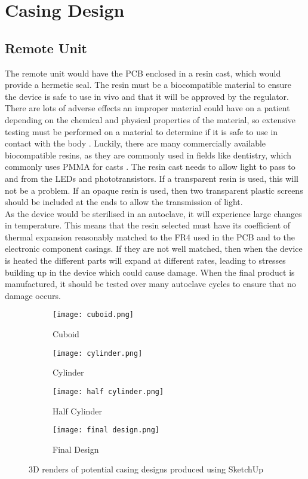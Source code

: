 \section{Casing Design}

\subsection{Remote Unit}
The remote unit would have the PCB enclosed in a resin cast, which would provide a hermetic seal. The resin must be a biocompatible material to ensure the device is safe to use in vivo and that it will be approved by the regulator. There are lots of adverse effects an improper material could have on a patient depending on the chemical and physical properties of the material, so extensive testing must be performed on a material to determine if it is safe to use in contact with the body \cite{biocompatible_tests}. Luckily, there are many commercially available biocompatible resins, as they are commonly used in fields like dentistry, which commonly uses PMMA for casts \cite{biocompatible_resin}. The resin cast needs to allow light to pass to and from the LEDs and phototransistors. If a transparent resin is used, this will not be a problem. If an opaque resin is used, then two transparent plastic screens should be included at the ends to allow the transmission of light.\\

As the device would be sterilised in an autoclave, it will experience large changes in temperature. This means that the resin selected must have its coefficient of thermal expansion reasonably matched to the FR4 used in the PCB and to the electronic component casings. If they are not well matched, then when the device is heated the different parts will expand at different rates, leading to stresses building up in the device which could cause damage. When the final product is manufactured, it should be tested over many autoclave cycles to ensure that no damage occurs.\\

\begin{figure}[htb]
	\centering
	\begin{subfigure}[b]{0.4\linewidth}
		\texttt{[image: cuboid.png]}
		\caption{Cuboid}
		\label{fig: cuboid}
	\end{subfigure}
	\begin{subfigure}[b]{0.4\linewidth}
		\texttt{[image: cylinder.png]}
		\caption{Cylinder}
		\label{fig: cylinder}
	\end{subfigure}
	\begin{subfigure}[b]{0.4\linewidth}
		\texttt{[image: half cylinder.png]}
		\caption{Half Cylinder}
		\label{fig: half cylinder}
	\end{subfigure}
	\begin{subfigure}[b]{0.4\linewidth}
		\texttt{[image: final design.png]}
		\caption{Final Design}
		\label{fig: final design}
	\end{subfigure}
	\caption{3D renders of potential casing designs produced using SketchUp \cite{sketchup}}
	\label{fig: casings}
\end{figure}

